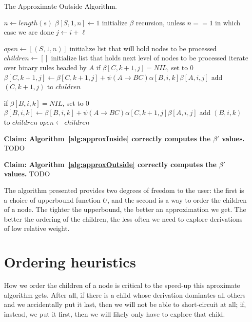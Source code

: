 \documentclass{article}
\begin{document}
\begin{algorithm}
\caption{The Approximate Outside Algorithm.\label{alg:approxOutside}}
\begin{algorithmic}[2]
  \State $n \leftarrow length(s)$
  \State $\beta[S, 1, n] \leftarrow 1$ \Comment initialize $\beta$ recursion, unless $n==1$ in which case we are done
      \State $j \leftarrow i + \ell$
    \EndFor
  \EndFor

  \State $open \leftarrow [(S, 1, n)]$ \Comment initialize list that will hold nodes to be processed
  \State $children \leftarrow []$ \Comment initialize list that holds next level of nodes to be processed
     \Comment iterate over binary rules headed by $A$
          \State if $\beta[C, k+1, j] = NIL$, set to $0$
          \State $\beta[C, k+1, j] \leftarrow \beta[C, k+1, j] + \psi(A \rightarrow B C) \alpha[B, i, k] \beta[A, i, j]$
          \State add $(C, k+1, j)$ to $children$
        \EndIf 

          \State if $\beta[B, i, k] = NIL$, set to $0$
          \State $\beta[B, i, k] \leftarrow \beta[B, i, k] + \psi(A \rightarrow B C) \alpha[C, k+1, j] \beta[A, i, j]$
          \State add $(B, i, k)$ to $children$
        \EndIf 
      \EndFor 
   \EndFor
   \EndFor
   \State $open \leftarrow children$
  \EndWhile    
\EndProcedure
\end{algorithmic}
\end{algorithm}


\noindent \textbf{Claim: Algorithm~\ref{alg:approxInside} correctly computes the $\beta'$ values.}
\noindent TODO

\noindent \textbf{Claim: Algorithm~\ref{alg:approxOutside} correctly computes the $\beta'$ values.}
\noindent TODO

The algorithm presented provides two degrees of freedom to the user: the first is a choice of upperbound function $U$, and the second is a way to order the children of a node. The tighter the upperbound, the better an approximation we get. The better the ordering of the children, the less often we need to explore derivations of low relative weight. 


\section{Ordering heuristics}
How we order the children of a node is critical to the speed-up this
aproximate algorithm gets. After all, if there is a child whose
derivation dominates all others and we accidentally put it last, then
we will not be able to short-circuit at all; if, instead, we put it
first, then we will likely only have to explore that child.
\end{document}
